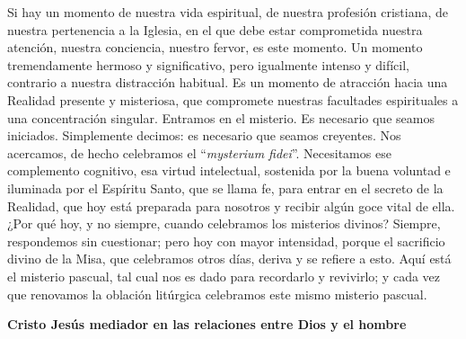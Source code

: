 			\begin{body}Si hay un momento de nuestra vida espiritual, de nuestra profesión cristiana, de nuestra pertenencia a la Iglesia, en el que debe estar comprometida nuestra atención, nuestra conciencia, nuestro fervor, es este momento. Un momento tremendamente hermoso y significativo, pero igualmente intenso y difícil, contrario a nuestra distracción habitual. Es un momento de atracción hacia una Realidad presente y misteriosa, que compromete nuestras facultades espirituales a una concentración singular. Entramos en el misterio. Es necesario que seamos iniciados. Simplemente decimos: es necesario que seamos creyentes. Nos acercamos, de hecho celebramos el “\textit{mysterium fidei}”. Necesitamos ese complemento cognitivo, esa virtud intelectual, sostenida por la buena voluntad e iluminada por el Espíritu Santo, que se llama fe, para entrar en el secreto de la Realidad, que hoy está preparada para nosotros y recibir algún goce vital de ella. ¿Por qué hoy, y no siempre, cuando celebramos los misterios divinos? Siempre, respondemos sin cuestionar; pero hoy con mayor intensidad, porque el sacrificio divino de la Misa, que celebramos otros días, deriva y se refiere a esto. Aquí está el misterio pascual, tal cual nos es dado para recordarlo y revivirlo; y cada vez que renovamos la oblación litúrgica celebramos este mismo misterio pascual.\end{body}
			
			\begin{bodycenter}\textbf{Cristo Jesús mediador en las relaciones entre Dios y el hombre }\end{bodycenter}
			
